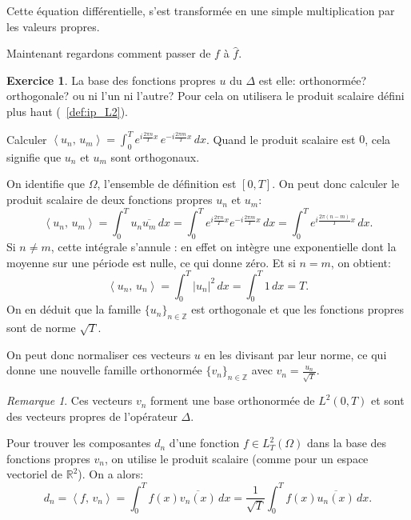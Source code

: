 \documentclass[11pt,a4paper]{article}
\numberwithin{equation}{section}
\theoremstyle{plain}
\theoremstyle{definition}
\newtheorem{exercise}[theorem]{Exercice}
\theoremstyle{remark}
\newtheorem*{remark}{Remarque}
\newcommand{\R}{\mathbb{R}}
\newcommand{\Z}{\mathbb{Z}}
\newcommand{\ip}[2]{\left\langle #1,\, #2\right\rangle}
\newcommand{\Lap}{\Delta}
\begin{document}
Cette équation différentielle, s'est transformée en une simple multiplication par les valeurs propres.

Maintenant regardons comment passer de $f$ à $\hat{f}$.

\begin{exercise}
    La base des fonctions propres $u$ du $\Lap$ est elle: orthonormée? orthogonale? ou ni l'un ni l'autre?
    Pour cela on utilisera le produit scalaire défini plus haut (~\ref{def:ip_L2}).
\end{exercise}

\begin{indication}
    Calculer $\ip{u_n}{u_m}=\int_0^T e^{i\frac{2\pi n}{T}x} \, e^{-i\frac{2\pi m}{T}x}\,dx$.
    Quand le produit scalaire est $0$, cela signifie que $u_n$ et $u_m$ sont orthogonaux.
\end{indication}

\begin{solution}
    On identifie que $\Omega$, l'ensemble de définition est $[0,T]$.
    On peut donc calculer le produit scalaire de deux fonctions propres $u_n$ et $u_m$:
    \[
        \ip{u_n}{u_m} = \int_0^T u_n \overline{u_m}\,dx = \int_0^T e^{i\frac{2\pi n}{T}x} e^{-i\frac{2\pi m}{T}x}\,dx = \int_0^T e^{i\frac{2\pi (n-m)}{T}x}\,dx.
    \]
    Si $n \neq m$, cette intégrale s'annule : en effet on intègre une exponentielle dont la moyenne sur une période est nulle, ce qui donne zéro.
    Et si $n = m$, on obtient:
    \[
        \ip{u_n}{u_n} = \int_0^T |u_n|^2\,dx = \int_0^T 1\,dx = T.
    \]
    On en déduit que la famille $\{u_n\}_{n \in \Z}$ est orthogonale et que les fonctions propres sont de norme $\sqrt{T}$.
\end{solution}

On peut donc normaliser ces vecteurs $u$ en les divisant par leur norme, ce qui donne une nouvelle famille orthonormée $\{v_n\}_{n \in \Z}$ avec $v_n = \frac{u_n}{\sqrt{T}}$.

\begin{remark}
    Ces vecteurs $v_n$ forment une base orthonormée de $L^2(0,T)$ et sont des vecteurs propres de l'opérateur $\Lap$.
\end{remark}

Pour trouver les composantes $d_n$ d'une fonction $f \in L^2_T(\Omega)$ dans la base des fonctions propres $v_n$, on utilise le produit scalaire (comme pour un espace vectoriel de $\R^2$).
On a alors:
\[
    d_n = \ip{f}{v_n} = \int_0^T f(x) \overline{v_n(x)}\,dx = \frac{1}{\sqrt{T}} \int_0^T f(x) \overline{u_n(x)}\,dx.
\]
\end{document}
